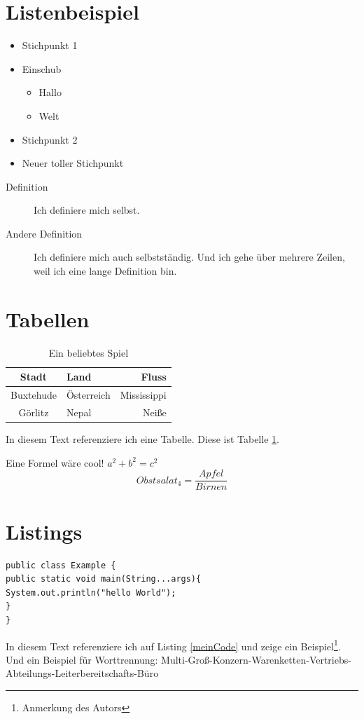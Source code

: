 \documentclass[]{scrreprt}
\begin{document}
\section{Listenbeispiel}

\begin{itemize}
\item Stichpunkt 1
\item Einschub
\begin{itemize}
\item Hallo
\item Welt
\end{itemize}

\item Stichpunkt 2
\item Neuer toller Stichpunkt
\end{itemize}

\begin{description}
\item [Definition] Ich definiere mich selbst.
\item [Andere Definition] Ich definiere mich auch selbstständig. Und ich gehe über mehrere Zeilen, weil ich eine lange Definition bin.
\end{description}

\section{Tabellen}

\begin{table}[h]
\centering
\begin{tabular}{|c||l|r|}
\hline
Stadt & Land & Fluss \\
\hline
Buxtehude & Österreich & Mississippi\\
\hline
Görlitz & Nepal & Neiße\\
\hline
\end{tabular}
\caption{Ein beliebtes Spiel}
\label{tab:stadt}
\end{table}

In diesem Text referenziere ich eine Tabelle. Diese ist Tabelle \ref{tab:stadt}.

Eine Formel wäre cool! $a^2 + b^2 = c^2$
\[ Obstsalat_4 = \frac{Apfel}{Birnen} \]

\section{Listings}

\begin{lstlisting}[caption=Example, label=meinCode]
public class Example {
public static void main(String...args){
System.out.println("hello World");
}
}
\end{lstlisting}


In diesem Text referenziere ich auf Listing \ref{meinCode} und zeige ein Beispiel\footnote{Anmerkung des Autors}. Und ein Beispiel für Worttrennung: Multi-Groß-Konzern-Warenketten-Vertriebs-Abteilungs-Leiterbereit\-schafts-Büro
\end{document}
